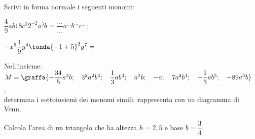 \subsubsection*{}

% 

\begin{esercizio}
\label{ese:9.2}
Scrivi in forma normale i seguenti monomi:
\begin{htmulticols}{2}
\(\dfrac{4}{9}ab18c^{3}2^{-2}a^{3}b=
\dfrac{\ldots }{\ldots }a^{\ldots}b^{\ldots }c^{\ldots };\)

\(-x^{5}\dfrac{1}{9}y^{4}\tonda{-1+5}^{2}y^{7}=\dotfill~\)
\end{htmulticols}
\end{esercizio}

\begin{esercizio}
\label{ese:9.3}
Nell'insieme:\\
\(M=\graffa{-{\dfrac{34}{5}}a^{3}b;\quad 3^{2}a^{2}b^{4};\quad 
\dfrac{1}{3}ab^{3};\quad a^{3}b;\quad -a;\quad 7a^{2}b^{4};\quad 
-\dfrac{1}{3}ab^{3};\quad -89a^{3}b}\),\\
determina i sottoinsiemi dei monomi simili; 
rappresenta con un diagramma di Venn.
\end{esercizio}


\begin{esercizio}
\label{ese:9.4}
Calcola l'area di un triangolo che ha altezza \quad \(h=2,5\) \quad e 
base \quad \(b=\dfrac{3}{4}\).
\end{esercizio}

